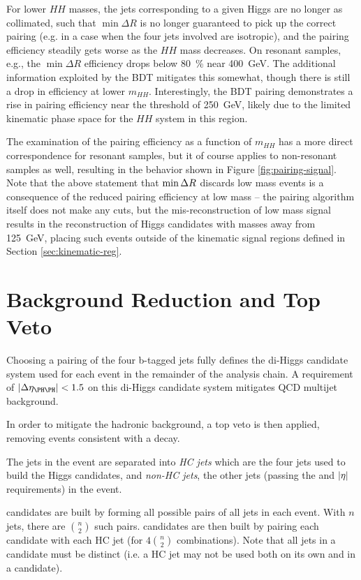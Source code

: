 For lower $HH$ masses, the jets corresponding to a given Higgs are no longer as collimated, such that 
$\min{\Delta R}$ is no longer guaranteed to pick up the correct pairing (e.g. in a case when the four jets 
involved are isotropic), and the pairing efficiency steadily gets worse as the $HH$ mass decreases. On 
resonant samples, e.g., the $\min{\Delta R}$ efficiency drops below 80~\% near \SI{400}{\GeV}. 
The additional information exploited by the BDT mitigates this somewhat, though there is still a drop 
in efficiency at lower $m_{HH}$. Interestingly, the BDT pairing demonstrates a 
rise in pairing efficiency near the threshold of \SI{250}{\GeV}, likely due to the limited kinematic 
phase space for the $HH$ system in this region.

The examination of the pairing efficiency as a function of $m_{HH}$ has a more direct correspondence for 
resonant samples, but it of course applies to non-resonant samples as well, resulting in the behavior shown 
in Figure \ref{fig:pairing-signal}. Note that the above statement 
that $\min{\ensuremath{\Delta R}}$ discards low mass events is a consequence of the reduced pairing efficiency at low mass -- 
the pairing algorithm itself does not make any cuts, but the mis-reconstruction of low mass signal results 
in the reconstruction of Higgs candidates with masses away from \SI{125}{\GeV}, placing such events outside of 
the kinematic signal regions defined in Section \ref{sec:kinematic-reg}.

\FloatBarrier
\clearpage
\section{Background Reduction and Top Veto}
\label{sec:kinematic-cuts}

Choosing a pairing of the four b-tagged jets fully defines the di-Higgs candidate system used for each event in the remainder of the analysis chain. A requirement of
$\abs{\Delta\eta_{\higgs\higgs}} < 1.5$ on this di-Higgs candidate system mitigates
QCD multijet background.

In order to mitigate the hadronic \ttbar background, a top veto is then applied,
removing events consistent with a 
decay.

The jets in the event are separated into \emph{HC jets} which are
the four jets used to build the Higgs candidates, and \emph{non-HC jets}, the
other jets (passing the \pt and $\abs{\eta}$ requirements) in the event.

\PW candidates are built by forming all possible pairs of all jets in each event.
With $n$ jets, there are $\binom{n}{2}$ such pairs. \Pqt candidates are then built
by pairing each \PW candidate with each HC jet (for $4\binom{n}{2}$ combinations).
Note that all jets in a \Pqt candidate must be distinct (i.e. a HC jet may not be
used both on its own and in a \PW candidate).

